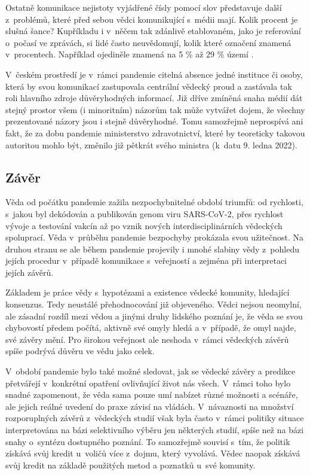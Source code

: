 Ostatně komunikace nejistoty vyjádřené čísly pomocí slov představuje další z~pro\-blé\-mů, které před sebou vědci komunikující s~médii mají. Kolik procent je slušná šance? Kupříkladu i v~něčem tak zdánlivě etablovaném, jako je referování o~počasí ve zprávách, si lidé často neuvědomují, kolik které označení znamená v~procentech. Například ojediněle znamená na 5 \% až 29 \% území \cite{Ceskyhydrometeorologickyustav}.

V~českém prostředí je v~rámci pandemie citelná absence jedné instituce či osoby, která by svou komunikací zastupovala centrální vědecký proud a zastávala tak roli hlavního zdroje důvěryhodných informací. Již dříve zmíněná snaha médií dát stejný prostor všem (i minoritním) názorům tak může vytvářet dojem, že všechny prezentované názory jsou i stejně důvěryhodné. Tomu samozřejmě neprospívá ani fakt, že za dobu pandemie ministerstvo zdravotnictví, které by teoreticky takovou autoritou mohlo být, změnilo již pětkrát svého ministra (k~datu 9. ledna 2022).

\subsection*{Závěr}

Věda od počátku pandemie zažila nezpochybnitelné období triumfů: od rychlosti, s~jakou byl dekódován a publikován genom viru SARS-CoV-2, přes rychlost vývoje a testování vakcín až po vznik nových interdisciplinárních vědeckých spoluprací. Věda v~průběhu pandemie bezpochyby prokázala svou užitečnost. Na druhou stranu se ale během pandemie projevily i mnohé slabiny vědy z~pohledu jejích procedur v~případě komunikace s~veřejností a zejména při interpretaci jejích závěrů.

Základem je práce vědy s~hypotézami a existence vědecké komunity, hledající konsenzus. Tedy neustálé přehodnocování již objeveného. Vědci nejsou neomylní, ale zásadní rozdíl mezi vědou a jinými druhy lidského poznání je, že věda se svou chybovostí předem počítá, aktivně své omyly hledá a v~případě, že omyl najde, své závěry mění. Pro širokou veřejnost ale neshoda v~rámci vědeckých závěrů spíše podrývá důvěru ve vědu jako celek.

V~období pandemie bylo také možné sledovat, jak se vědecké závěry a predikce přetvářejí v~konkrétní opatření ovlivňující život nás všech. V~rámci toho bylo snadné zapomenout, že věda sama pouze umí nabízet různé možnosti a scénáře, ale jejich reálné uvedení do praxe závisí na vládách. V~návaznosti na množství rozporuplných závěrů z~vědeckých studií však byla často v~rámci politiky situace interpretována na bázi selektivního výběru jen některých studií, spíše než na bázi snahy o~syntézu dostupného poznání. To samozřejmě souvisí s~tím, že politik získává svůj kredit u~voličů více z~dojmu, který vyvolává. Vědec naopak získává svůj kredit na základě použitých metod a poznatků u~své komunity.

